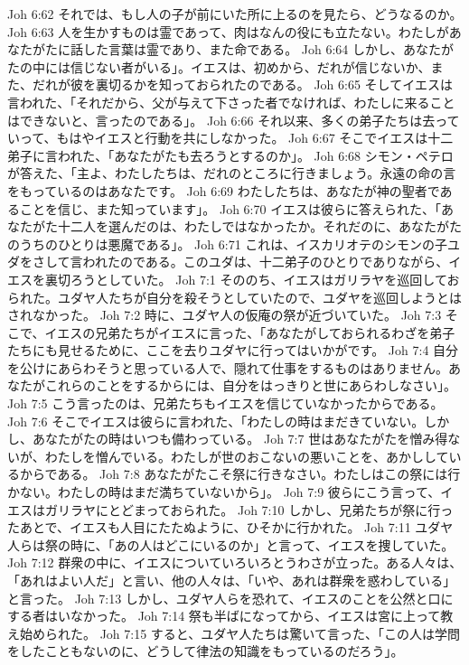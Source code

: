 Joh 6:62  それでは、もし人の子が前にいた所に上るのを見たら、どうなるのか。
Joh 6:63  人を生かすものは霊であって、肉はなんの役にも立たない。わたしがあなたがたに話した言葉は霊であり、また命である。
Joh 6:64  しかし、あなたがたの中には信じない者がいる」。イエスは、初めから、だれが信じないか、また、だれが彼を裏切るかを知っておられたのである。
Joh 6:65  そしてイエスは言われた、「それだから、父が与えて下さった者でなければ、わたしに来ることはできないと、言ったのである」。
Joh 6:66  それ以来、多くの弟子たちは去っていって、もはやイエスと行動を共にしなかった。
Joh 6:67  そこでイエスは十二弟子に言われた、「あなたがたも去ろうとするのか」。
Joh 6:68  シモン・ペテロが答えた、「主よ、わたしたちは、だれのところに行きましょう。永遠の命の言をもっているのはあなたです。
Joh 6:69  わたしたちは、あなたが神の聖者であることを信じ、また知っています」。
Joh 6:70  イエスは彼らに答えられた、「あなたがた十二人を選んだのは、わたしではなかったか。それだのに、あなたがたのうちのひとりは悪魔である」。
Joh 6:71  これは、イスカリオテのシモンの子ユダをさして言われたのである。このユダは、十二弟子のひとりでありながら、イエスを裏切ろうとしていた。
Joh 7:1  そののち、イエスはガリラヤを巡回しておられた。ユダヤ人たちが自分を殺そうとしていたので、ユダヤを巡回しようとはされなかった。
Joh 7:2  時に、ユダヤ人の仮庵の祭が近づいていた。
Joh 7:3  そこで、イエスの兄弟たちがイエスに言った、「あなたがしておられるわざを弟子たちにも見せるために、ここを去りユダヤに行ってはいかがです。
Joh 7:4  自分を公けにあらわそうと思っている人で、隠れて仕事をするものはありません。あなたがこれらのことをするからには、自分をはっきりと世にあらわしなさい」。
Joh 7:5  こう言ったのは、兄弟たちもイエスを信じていなかったからである。
Joh 7:6  そこでイエスは彼らに言われた、「わたしの時はまだきていない。しかし、あなたがたの時はいつも備わっている。
Joh 7:7  世はあなたがたを憎み得ないが、わたしを憎んでいる。わたしが世のおこないの悪いことを、あかししているからである。
Joh 7:8  あなたがたこそ祭に行きなさい。わたしはこの祭には行かない。わたしの時はまだ満ちていないから」。
Joh 7:9  彼らにこう言って、イエスはガリラヤにとどまっておられた。
Joh 7:10  しかし、兄弟たちが祭に行ったあとで、イエスも人目にたたぬように、ひそかに行かれた。
Joh 7:11  ユダヤ人らは祭の時に、「あの人はどこにいるのか」と言って、イエスを捜していた。
Joh 7:12  群衆の中に、イエスについていろいろとうわさが立った。ある人々は、「あれはよい人だ」と言い、他の人々は、「いや、あれは群衆を惑わしている」と言った。
Joh 7:13  しかし、ユダヤ人らを恐れて、イエスのことを公然と口にする者はいなかった。
Joh 7:14  祭も半ばになってから、イエスは宮に上って教え始められた。
Joh 7:15  すると、ユダヤ人たちは驚いて言った、「この人は学問をしたこともないのに、どうして律法の知識をもっているのだろう」。
